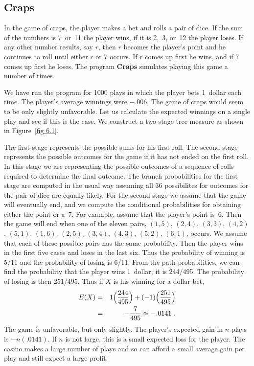 \subsection*{Craps}

\begin{example}\label{exam 6.6} In the game of craps, the player makes a bet and
rolls a pair of dice.  If the sum of the numbers is 7~or~11 the player wins, if it is
2,~3, or~12 the player loses.  If any other number results, say $r$, then $r$ becomes
the player's point and he continues to roll until either $r$ or 7 occurs.  If $r$
comes up first he wins, and if 7 comes up first he loses.  The program {\bf Craps} simulates playing this game a number of times.
\par We have run the program for 1000 plays in which the player bets 1~dollar each
time.  The player's average winnings were $-.006$.  The game of craps would seem to
be only slightly unfavorable.  Let us calculate the expected winnings on a single
play and see if this is the case.  We construct a two-stage tree measure as shown in
Figure~\ref{fig 6.1}.


The first stage represents the possible sums for his first roll.  The second stage
represents the possible outcomes for the game if it has not ended on the first roll. 
In this stage we are representing the possible outcomes of a sequence of rolls
required to determine the final outcome.  The branch probabilities for the first
stage are computed in the usual way assuming all 36 possibilites for outcomes for the
pair of dice are equally likely.  For the second stage we assume that the game will
eventually end, and we compute the conditional probabilities for obtaining either the
point or a~7.  For example, assume that the player's point is~6.  Then the game will
end when one of the eleven pairs, $(1,5)$, $(2,4)$, $(3,3)$, $(4,2)$, $(5,1)$,
$(1,6)$, $(2,5)$,
$(3,4)$, $(4,3)$, $(5,2)$, $(6,1)$, occurs.  We assume that each of these possible
pairs has the same probability.  Then the player wins in the first five cases and
loses in the last six.  Thus the probability of winning is 5/11 and the probability
of losing is 6/11.  From the path probabilities, we can find the probability that the
player wins 1~dollar; it is 244/495.  The probability of losing is then 251/495. 
Thus if $X$ is his winning for a dollar bet,
\begin{eqnarray*} E(X) & = & 1\Bigl(\frac {244}{495}\Bigr) + (-1)\Bigl(\frac
{251}{495}\Bigr) \\
     & = & -\frac {7}{495} \approx -.0141\ .
\end{eqnarray*} The game is unfavorable, but only slightly.  The player's expected
gain in $n$ plays is $-n(.0141)$.  If $n$ is not large, this is a small expected loss
for the player.  The casino makes a large number of plays and so can afford a small
average gain per play and still expect a large profit.
\end{example}

